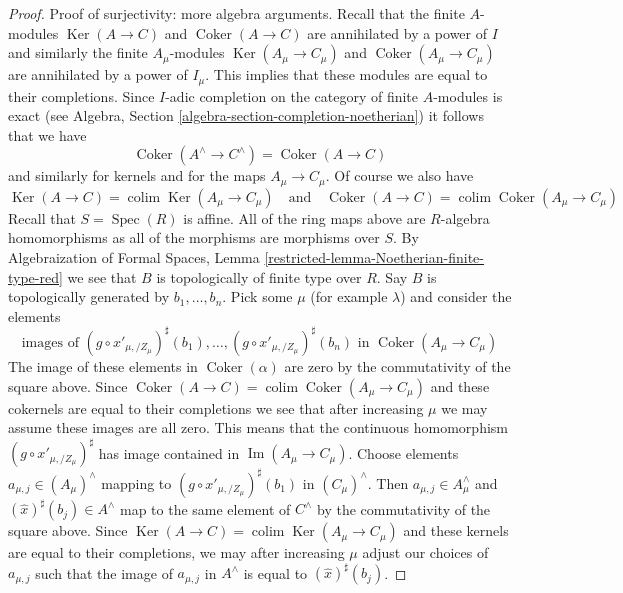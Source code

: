 \documentclass[10pt,a4paper]{amsart}
\theoremstyle{plain}
\theoremstyle{definition}
\theoremstyle{remark}
\numberwithin{equation}{subsection}
\def\colim{\mathop{\mathrm{colim}}\nolimits}
\def\Spec{\mathop{\mathrm{Spec}}}
\def\Ker{\mathop{\mathrm{Ker}}}
\def\Im{\mathop{\mathrm{Im}}}
\def\Coker{\mathop{\mathrm{Coker}}}
\begin{document}
\begin{proof}
\medskip\noindent
Proof of surjectivity: more algebra arguments. Recall that the finite
$A$-modules $\Ker(A \to C)$ and $\Coker(A \to C)$ are annihilated
by a power of $I$ and similarly the finite $A_\mu$-modules
$\Ker(A_\mu \to C_\mu)$ and $\Coker(A_\mu \to C_\mu)$ are annihilated
by a power of $I_\mu$. This implies that these modules are
equal to their completions. Since $I$-adic completion on the category of
finite $A$-modules is exact (see
Algebra, Section \ref{algebra-section-completion-noetherian})
it follows that we have
$$
\Coker(A^\wedge \to C^\wedge) = \Coker(A \to C)
$$
and similarly for kernels and for the maps $A_\mu \to C_\mu$.
Of course we also have
$$
\Ker(A \to C) = \colim \Ker(A_\mu \to C_\mu)
\quad\text{and}\quad
\Coker(A \to C) = \colim \Coker(A_\mu \to C_\mu)
$$
Recall that $S = \Spec(R)$ is affine. All of the ring maps
above are $R$-algebra homomorphisms as all of the morphisms
are morphisms over $S$. By
Algebraization of Formal Spaces, Lemma
\ref{restricted-lemma-Noetherian-finite-type-red}
we see that $B$ is topologically of finite type over $R$.
Say $B$ is topologically generated by $b_1, \ldots, b_n$.
Pick some $\mu$ (for example $\lambda$) and consider
the elements
$$
\text{images of }
(g \circ x'_{\mu, /Z_\mu})^\sharp(b_1)
, \ldots,
(g \circ x'_{\mu, /Z_\mu})^\sharp(b_n)
\text{ in }\Coker(A_\mu \to C_\mu)
$$
The image of these elements in $\Coker(\alpha)$ are zero
by the commutativity of the square above. Since
$\Coker(A \to C) = \colim \Coker(A_\mu \to C_\mu)$ and these
cokernels are equal to their completions
we see that after increasing $\mu$ we may assume these
images are all zero. This means that the continuous
homomorphism $(g \circ x'_{\mu, /Z_\mu})^\sharp$ has image contained
in $\Im(A_\mu \to C_\mu)$.
Choose elements $a_{\mu, j} \in (A_\mu)^\wedge$ mapping to
$(g \circ x'_{\mu, /Z_\mu})^\sharp(b_1)$ in $(C_\mu)^\wedge$.
Then $a_{\mu, j} \in A_\mu^\wedge$ and $(\hat x)^\sharp(b_j) \in A^\wedge$
map to the same element of $C^\wedge$ by the commutativity of the
square above. Since
$\Ker(A \to C) = \colim \Ker(A_\mu \to C_\mu)$ and these kernels
are equal to their completions, we may after increasing
$\mu$ adjust our choices of $a_{\mu, j}$ such that
the image of $a_{\mu, j}$ in $A^\wedge$ is equal to $(\hat x)^\sharp(b_j)$.


\end{proof}
\end{document}

